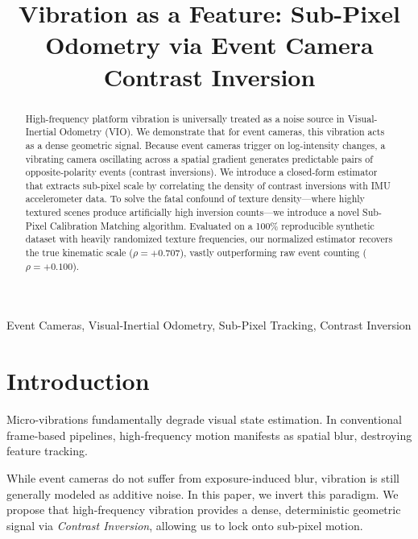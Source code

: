 \documentclass[conference]{IEEEtran}
\begin{document}
\title{Vibration as a Feature: Sub-Pixel Odometry via Event Camera Contrast Inversion\\}

\author{
}

\maketitle

\begin{abstract}
High-frequency platform vibration is universally treated as a noise source in Visual-Inertial Odometry (VIO). We demonstrate that for event cameras, this vibration acts as a dense geometric signal. Because event cameras trigger on log-intensity changes, a vibrating camera oscillating across a spatial gradient generates predictable pairs of opposite-polarity events (contrast inversions). We introduce a closed-form estimator that extracts sub-pixel scale by correlating the density of contrast inversions with IMU accelerometer data. To solve the fatal confound of texture density—where highly textured scenes produce artificially high inversion counts—we introduce a novel Sub-Pixel Calibration Matching algorithm. Evaluated on a 100\% reproducible synthetic dataset with heavily randomized texture frequencies, our normalized estimator recovers the true kinematic scale ($\rho = +0.707$), vastly outperforming raw event counting ($\rho = +0.100$).
\end{abstract}

\begin{IEEEkeywords}
Event Cameras, Visual-Inertial Odometry, Sub-Pixel Tracking, Contrast Inversion
\end{IEEEkeywords}

\section{Introduction}
Micro-vibrations fundamentally degrade visual state estimation. In conventional frame-based pipelines, high-frequency motion manifests as spatial blur, destroying feature tracking. 

While event cameras do not suffer from exposure-induced blur, vibration is still generally modeled as additive noise. In this paper, we invert this paradigm. We propose that high-frequency vibration provides a dense, deterministic geometric signal via \textit{Contrast Inversion}, allowing us to lock onto sub-pixel motion.
\end{document}
